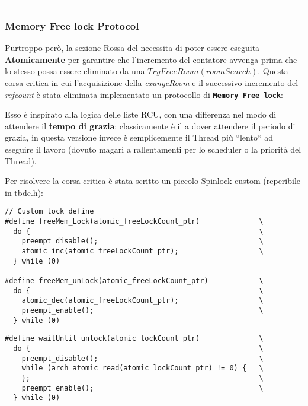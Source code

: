 \rule{\textwidth}{1pt}
\subsubsection{Memory Free lock Protocol}\label{memFreeLockProt}

Purtroppo però, la sezione {\color{red} Rossa} del  necessita di poter essere
eseguita \textbf{Atomicamente} per garantire che l'incremento del contatore avvenga prima che lo stesso possa essere
eliminato da una {\color{blue}$TryFreeRoom(roomSearch)$}. Questa corsa critica in cui l'acquisizione della
\textit{exangeRoom} e il successivo incremento del \textit{refcount} è stata eliminata implementato un protocollo di
\texttt{\textbf{Memory Free lock}}:

Esso è inspirato alla logica delle liste RCU, con una differenza nel modo di attendere il \textbf{tempo di grazia}:
classicamente è il \Writer a dover attendere il periodo di grazia, in questa versione invece è semplicemente il Thread
più ``lento`` ad eseguire il lavoro (dovuto magari a rallentamenti per lo scheduler o la priorità del Thread).

Per risolvere la corsa critica è stata scritto un piccolo Spinlock custom (reperibile in tbde.h):


\begin{indentPar}{2.5cm}
\begin{small}
{\color{red}\begin{verbatim}
// Custom lock define
#define freeMem_Lock(atomic_freeLockCount_ptr)              \
  do {                                                      \
    preempt_disable();                                      \
    atomic_inc(atomic_freeLockCount_ptr);                   \
  } while (0)

#define freeMem_unLock(atomic_freeLockCount_ptr)            \
  do {                                                      \
    atomic_dec(atomic_freeLockCount_ptr);                   \
    preempt_enable();                                       \
  } while (0)
\end{verbatim}}

{\color{blue}\begin{verbatim}
#define waitUntil_unlock(atomic_lockCount_ptr)              \
  do {                                                      \
    preempt_disable();                                      \
    while (arch_atomic_read(atomic_lockCount_ptr) != 0) {   \
    };                                                      \
    preempt_enable();                                       \
  } while (0)
\end{verbatim}}
\end{small}
\end{indentPar}


